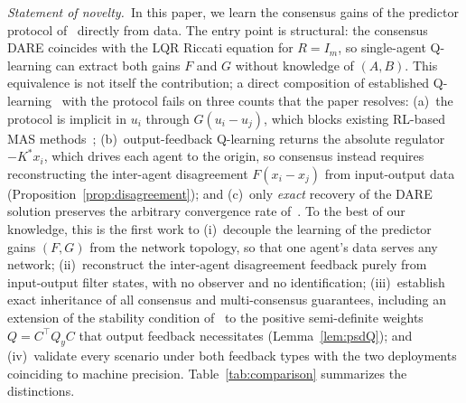 \documentclass[final,5p,times]{elsarticle}
\theoremstyle{plain}
\theoremstyle{definition}
\theoremstyle{remark}
\begin{document}
\emph{Statement of novelty.}\ In this paper, we learn the consensus gains of the predictor protocol of~\cite{cacace2024} directly from data. The entry point is structural: the consensus DARE coincides with the LQR Riccati equation for $R = I_m$, so single-agent Q-learning can extract both gains $F$ and $G$ without knowledge of $(A,B)$. This equivalence is not itself the contribution; a direct composition of established Q-learning~\cite{bradtke1994,lewis2009,rizvi2022} with the protocol fails on three counts that the paper resolves: (a)~the protocol is implicit in $u_i$ through $G(u_i-u_j)$, which blocks existing RL-based MAS methods~\cite{zhang2011}; (b)~output-feedback Q-learning returns the absolute regulator $-K^*x_i$, which drives each agent to the origin, so consensus instead requires reconstructing the inter-agent disagreement $F(x_i-x_j)$ from input-output data (Proposition~\ref{prop:disagreement}); and (c)~only \emph{exact} recovery of the DARE solution preserves the arbitrary convergence rate of~\cite{cacace2024}. To the best of our knowledge, this is the first work to (i)~decouple the learning of the predictor gains $(F,G)$ from the network topology, so that one agent's data serves any network; (ii)~reconstruct the inter-agent disagreement feedback purely from input-output filter states, with no observer and no identification; (iii)~establish exact inheritance of all consensus and multi-consensus guarantees, including an extension of the stability condition of~\cite{cacace2024} to the positive semi-definite weights $Q = C^\top Q_y C$ that output feedback necessitates (Lemma~\ref{lem:psdQ}); and (iv)~validate every scenario under both feedback types with the two deployments coinciding to machine precision. Table~\ref{tab:comparison} summarizes the distinctions.
\end{document}
